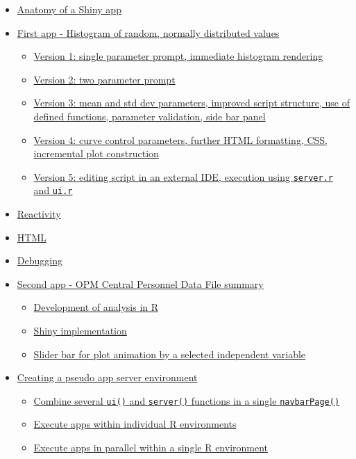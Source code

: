 \documentclass[10pt, letterpaper]{article}
\begin{document}
\begin{spacing}{1.0}
\begin{itemize}
\begin{itemize}
      \end{itemize}
    \item \hyperref[sec:anatomyofapp]{Anatomy of a Shiny app}
    \item \hyperref[sec:firstappNPD]{First app - Histogram of random, normally distributed values}
      \begin{itemize}
        \item \hyperref[sec:NPD-1]{Version 1:  single parameter prompt, immediate histogram rendering}
        \item \hyperref[sec:NPD-2]{Version 2:  two parameter prompt}
        \item \hyperref[sec:NPD-3]{Version 3:  mean and std dev parameters, improved script structure, use of defined functions, parameter validation, side bar panel}
        \item \hyperref[sec:NPD-4]{Version 4:  curve control parameters, further HTML formatting, CSS, incremental plot construction}
        \item \hyperref[sec:NPD-5]{Version 5:  editing script in an external IDE, execution using \texttt{server.r} and \texttt{ui.r}}
      \end{itemize}
    \item \hyperref[sec:reactivity]{Reactivity}
    \item \hyperref[sec:HTML]{HTML}
    \item \hyperref[sec:debugging]{Debugging}
    \item \hyperref[sec:CPDF]{Second app - OPM Central Personnel Data File summary}
      \begin{itemize}
        \item \hyperref[sec:CPDF-R]{Development of analysis in R}
        \item \hyperref[sec:CPDF-Shiny]{Shiny implementation}
        \item \hyperref[sec:CPDF-Slider]{Slider bar for plot animation by a selected independent variable}
      \end{itemize}
    \item \hyperref[sec:nav]{Creating a pseudo app server environment}
      \begin{itemize}
        \item \hyperref[sec:navbarpage]{Combine several \texttt{ui()} and \texttt{server()} functions in a single \texttt{navbarPage()}}
        \item \hyperref[sec:navindivproc]{Execute apps within individual R environments}
        \item \hyperref[sec:navparproc]{Execute apps in parallel within a single R environment}
      \end{itemize}
        

\end{itemize}
\end{spacing}
\end{document}
